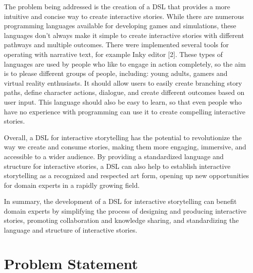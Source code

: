 The problem being addressed is the creation of a DSL that provides a more intuitive and concise way to create interactive stories. While there are numerous programming languages available for developing games and simulations, these languages don’t always make it simple to create interactive stories with different pathways and multiple outcomes. There were implemented several tools for operating with narrative text, for example Inky editor [2].	
These types of languages are used by people who like to engage in action completely, so the aim is to please different groups of people, including: young adults, gamers and virtual reality enthusiasts. It should allow users to easily create branching story paths, define character actions, dialogue, and create different outcomes based on user input. This language should also be easy to learn, so that even people who have no experience with programming can use it to create compelling interactive stories.


Overall, a DSL for interactive storytelling has the potential to revolutionize the way we create and consume stories, making them more engaging, immersive, and accessible to a wider audience. By providing a standardized language and structure for interactive stories, a DSL can also help to establish interactive storytelling as a recognized and respected art form, opening up new opportunities for domain experts in a rapidly growing field.

In summary, the development of a DSL for interactive storytelling can benefit domain experts by simplifying the process of designing and producing interactive stories, promoting collaboration and knowledge sharing, and standardizing the language and structure of interactive stories.
\section{Problem Statement}   

